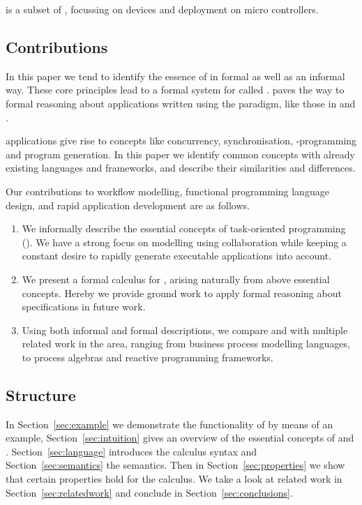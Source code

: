 \MTASKS is a subset of \ITASKS,
focussing on \IOT devices and deployment on micro controllers.




\subsection{Contributions}



In this paper we tend to identify the essence of \TOP in formal as well as an informal way.
These core principles lead to a formal system for \TOP called \TOPHAT.
\TOPHAT paves the way to formal reasoning about applications written using the \TOP paradigm,
like those in \ITASKS and \MTASKS.

\TOP applications give rise to concepts like concurrency, synchronisation, \GUI-programming and program generation.
In this paper we identify common concepts with already existing languages and frameworks,
and describe their similarities and differences.



Our contributions to workflow modelling, functional programming language design, and rapid application development are as follows.

\begin{enumerate}

  \item
    We informally describe the essential concepts of task-oriented programming (\TOP).
    We have a strong focus on modelling using collaboration
    while keeping a constant desire to rapidly generate executable applications into account.

  \item
    We present a formal calculus for \TOP, arising naturally from above essential concepts.
    Hereby we provide ground work to apply formal reasoning about \TOP specifications in future work.

  \item
    Using both informal and formal descriptions, we compare \TOP and \TOPHAT with multiple related work in the area,
    ranging from business process modelling languages, to process algebras and reactive programming frameworks.

\end{enumerate}



\subsection{Structure}

In Section~\ref{sec:example} we demonstrate the functionality of \TOPHAT by means of an example,
Section~\ref{sec:intuition} gives an overview of the essential concepts of \TOP and \TOPHAT.
Section~\ref{sec:language} introduces the \TOPHAT calculus syntax
and Section~\ref{sec:semantics} the semantics.
Then in Section~\ref{sec:properties} we show that certain properties hold for the calculus.
We take a look at related work in Section~\ref{sec:relatedwork}
and conclude in Section~\ref{sec:conclusions}.
